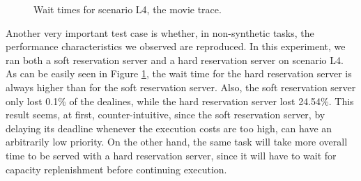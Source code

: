 \documentclass[times, 10pt,twocolumn]{article}
\begin{document}
\begin{figure}[t]
  \centering
  \caption{Wait times for scenario L4, the movie trace.}
  \label{fig:eve}
\end{figure}

Another very important test case is whether, in non-synthetic tasks,
the performance characteristics we observed are reproduced. In this
experiment, we ran both a soft reservation server and a hard
reservation server on scenario L4. As can be easily seen in Figure
\ref{fig:eve}, the wait time for the hard reservation server is always
higher than for the soft reservation server. Also, the soft
reservation server only lost 0.1\% of the dealines, while the hard
reservation server lost 24.54\%. This result seems, at first,
counter-intuitive, since the soft reservation server, by delaying its
deadline whenever the execution costs are too high, can have an
arbitrarily low priority. On the other hand, the same task will take
more overall time to be served with a hard reservation server, since
it will have to wait for capacity replenishment before continuing
execution.
\end{document}
